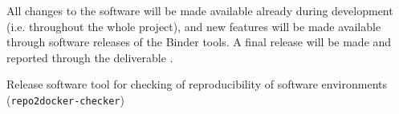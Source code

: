 \begin{workpackage}[
  id=reproducibility,
  wphases=0-36!1,
  title=Improving robustness of reproducibility tools,
  short=Core,
  lead=QS,
  SRLRM=24,
  UIORM=0,
  MPRM=2,
  QSRM=12,
  swsites,
]
\begin{wpdescription}
All changes to the software will be made available already during development
(i.e. throughout the whole project), and new features will be made available
through software releases of the Binder tools. A final release will be made and
reported through the deliverable .

%

\end{wpdescription}

\begin{tasklist}






\end{tasklist}


\begin{wpdelivs}


  \begin{wpdeliv}[due=24,miles=prototype,id=deliv-id-repo2docker-checker-software,dissem=PU,nature=OTHER,lead=SRL]
    {Release software tool for checking of reproducibility of software
      environments (\texttt{repo2docker-checker})}
  \end{wpdeliv}


\end{wpdelivs}
\end{workpackage}
